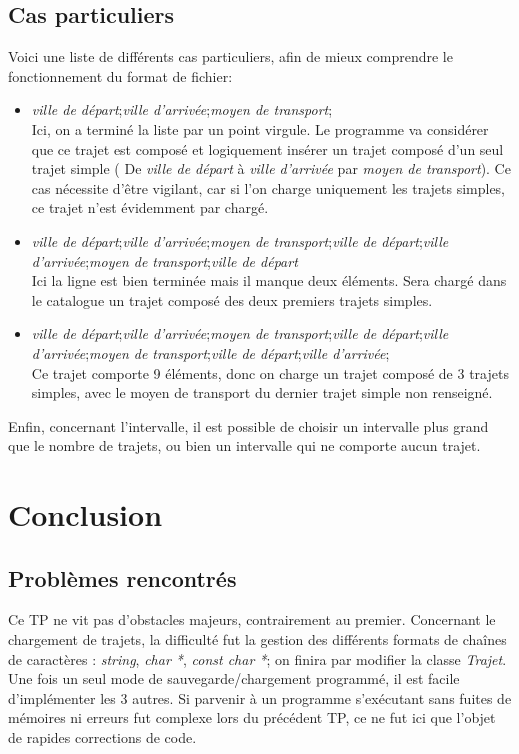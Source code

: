 \documentclass[a4paper]{article}
\begin{document}
\subsection{Cas particuliers}
Voici une liste de différents cas particuliers, afin de mieux comprendre le fonctionnement du format de fichier: 
\begin{itemize}
  \item \textit{ville de départ};\textit{ville d'arrivée};\textit{moyen de transport};\\
  Ici, on a terminé la liste par un point virgule. Le programme va considérer que ce trajet est composé et logiquement insérer un trajet composé d'un seul trajet simple ( De \textit{ville de départ} à \textit{ville d'arrivée} par \textit{moyen de transport}). Ce cas nécessite d'être vigilant, car si l'on charge uniquement les trajets simples, ce trajet n'est évidemment par chargé.
  \item \textit{ville de départ};\textit{ville d'arrivée};\textit{moyen de transport};\textit{ville de départ};\textit{ville d'arrivée};\textit{moyen de transport};\textit{ville de départ} \\
  Ici la ligne est bien terminée mais il manque deux éléments. Sera chargé dans le catalogue un trajet composé des deux premiers trajets simples.
  \item \textit{ville de départ};\textit{ville d'arrivée};\textit{moyen de transport};\textit{ville de départ};\textit{ville d'arrivée};\textit{moyen de transport};\textit{ville de départ};\textit{ville d'arrivée};\\
  Ce trajet comporte 9 éléments, donc on charge un trajet composé de 3 trajets simples, avec le moyen de transport du dernier trajet simple non renseigné.
\end{itemize}  

Enfin, concernant l'intervalle, il est possible de choisir un intervalle plus grand que le nombre de trajets, ou bien un intervalle qui ne comporte aucun trajet.
 
\section{Conclusion}

\subsection{Problèmes rencontrés}

Ce TP ne vit pas d'obstacles majeurs, contrairement au premier. Concernant le chargement de trajets, la difficulté fut la gestion des différents formats de chaînes de caractères : \textit{string}, \textit{char *}, \textit{const char *}; on finira par modifier la classe \textit{Trajet}. Une fois un seul mode de sauvegarde/chargement programmé, il est facile d'implémenter les 3 autres. Si parvenir à un programme s'exécutant sans fuites de mémoires ni erreurs fut complexe lors du précédent TP, ce ne fut ici que l'objet de rapides corrections de code.
\end{document}

